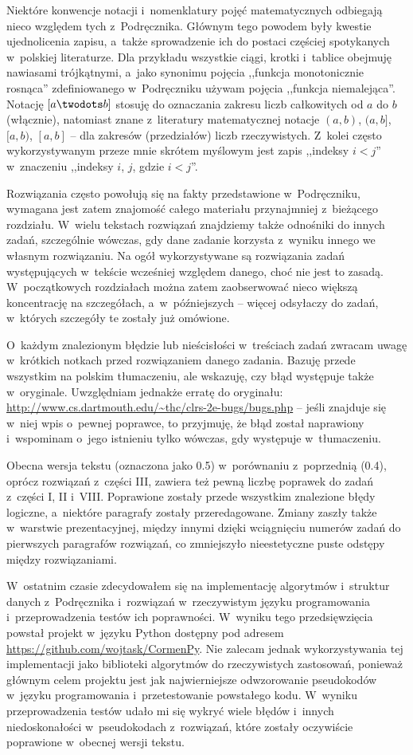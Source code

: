 Niektóre konwencje notacji i~nomenklatury pojęć matematycznych odbiegają nieco względem tych z~Podręcznika.
Głównym tego powodem były kwestie ujednolicenia zapisu, a~także sprowadzenie ich do postaci częściej spotykanych w~polskiej literaturze.
Dla przykładu wszystkie ciągi, krotki i~tablice obejmuję nawiasami trójkątnymi, a~jako synonimu pojęcia ,,funkcja monotonicznie rosnąca'' zdefiniowanego w~Podręczniku używam pojęcia ,,funkcja niemalejąca''.
Notację $[a\twodots b]$ stosuję do oznaczania zakresu liczb całkowitych od $a$ do $b$ (włącznie), natomiast znane z~literatury matematycznej notacje $(a,b)$, $(a,b]$, $[a,b)$, $[a,b]$ -- dla zakresów (przedziałów) liczb rzeczywistych.
Z~kolei często wykorzystywanym przeze mnie skrótem myślowym jest zapis ,,indeksy $i<j$'' w~znaczeniu ,,indeksy $i$, $j$, gdzie $i<j$''.

Rozwiązania często powołują się na fakty przedstawione w~Podręczniku, wymagana jest zatem znajomość całego materiału przynajmniej z~bieżącego rozdziału.
W~wielu tekstach rozwiązań znajdziemy także odnośniki do innych zadań, szczególnie wówczas, gdy dane zadanie korzysta z~wyniku innego we własnym rozwiązaniu.
Na ogół wykorzystywane są rozwiązania zadań występujących w~tekście wcześniej względem danego, choć nie jest to zasadą.
W~początkowych rozdziałach można zatem zaobserwować nieco większą koncentrację na szczegółach, a~w~późniejszych -- więcej odsyłaczy do zadań, w~których szczegóły te zostały już omówione.

O~każdym znalezionym błędzie lub nieścisłości w~treściach zadań zwracam uwagę w~krótkich notkach przed rozwiązaniem danego zadania.
Bazuję przede wszystkim na polskim tłumaczeniu, ale wskazuję, czy błąd występuje także w~oryginale.
Uwzględniam jednakże erratę do oryginału: \url{http://www.cs.dartmouth.edu/~thc/clrs-2e-bugs/bugs.php} -- jeśli znajduje się w~niej wpis o~pewnej poprawce, to przyjmuję, że błąd został naprawiony i~wspominam o~jego istnieniu tylko wówczas, gdy występuje w~tłumaczeniu.

Obecna wersja tekstu (oznaczona jako 0.5) w~porównaniu z~poprzednią (0.4), oprócz rozwiązań z~części III, zawiera też pewną liczbę poprawek do zadań z~części I, II i~VIII.
Poprawione zostały przede wszystkim znalezione błędy logiczne, a~niektóre paragrafy zostały przeredagowane.
Zmiany zaszły także w~warstwie prezentacyjnej, między innymi dzięki wciągnięciu numerów zadań do pierwszych paragrafów rozwiązań, co zmniejszyło nieestetyczne puste odstępy między rozwiązaniami.

W~ostatnim czasie zdecydowałem się na implementację algorytmów i~struktur danych z~Podręcznika i~rozwiązań w~rzeczywistym języku programowania i~przeprowadzenia testów ich poprawności.
W~wyniku tego przedsięwzięcia powstał projekt w~języku Python dostępny pod adresem \url{https://github.com/wojtask/CormenPy}.
Nie zalecam jednak wykorzystywania tej implementacji jako biblioteki algorytmów do rzeczywistych zastosowań, ponieważ głównym celem projektu jest jak najwierniejsze odwzorowanie pseudokodów w~języku programowania i~przetestowanie powstałego kodu.
W~wyniku przeprowadzenia testów udało mi się wykryć wiele błędów i~innych niedoskonałości w~pseudokodach z~rozwiązań, które zostały oczywiście poprawione w~obecnej wersji tekstu.


